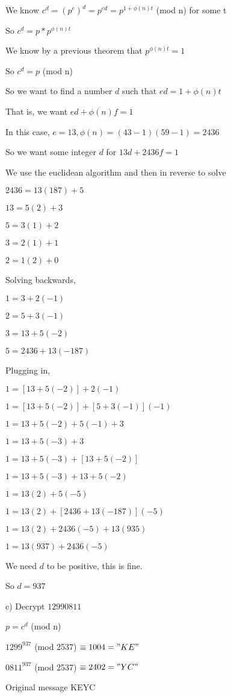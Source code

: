 \documentclass[11pt]{article}
\begin{document}
\begin{itemize}
  We know $c^d = (p^e)^d = p^{ed} = p^{1+\phi(n)t}$ (mod n) for some t

  So $c^d = p * p^{\phi(n)t}$

  We know by a previous theorem that $p^{\phi(n)t} = 1$

  So $c^d = p$ (mod n)

  So we want to find a number $d$ such that $ed = 1 + \phi(n)t$

  That is, we want $ed + \phi(n)f = 1$

  In this case, $e = 13, \phi(n) = (43 - 1)(59 - 1) = 2436$

  So we want some integer $d$ for $13d + 2436f = 1$

  We use the euclidean algorithm and then in reverse to solve

  $2436 = 13(187) + 5$

  $13 = 5(2) + 3$

  $5 = 3(1) + 2$

  $3 = 2(1) + 1$

  $2 = 1(2) + 0$

  Solving backwards,

  $1 = 3 + 2(-1)$

  $2 = 5 + 3(-1)$

  $3 = 13 + 5(-2)$

  $5 = 2436 + 13(-187)$

  Plugging in,

  $1 = [13 + 5(-2)] + 2(-1)$

  $1 = [13 + 5(-2)] + [5 + 3(-1)](-1)$

  $1 = 13 + 5(-2) + 5(-1) + 3$

  $1 = 13 + 5(-3) + 3$

  $1 = 13 + 5(-3) + [13 + 5(-2)]$

  $1 = 13 + 5(-3) + 13 + 5(-2)$

  $1 = 13(2) + 5(-5)$

  $1 = 13(2) + [2436 + 13(-187)](-5)$

  $1 = 13(2) + 2436(-5) + 13(935)$

  $1 = 13(937) + 2436(-5)$

  We need $d$ to be positive, this is fine.

  So $d = 937$ 

  c) Decrypt $1299 0811$

  $p = c^d$ (mod n)

  $1299^{937}$ (mod 2537) $\equiv 1004 = "KE"$

  $0811^{937}$ (mod 2537) $\equiv 2402 = "YC"$

  Original message KEYC
\end{itemize}
\end{document}
